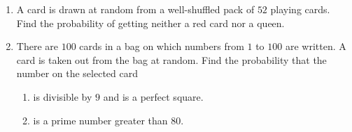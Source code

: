 \begin{enumerate}
    \item A card is drawn at random from a well-shuffled pack of $52$ playing cards. Find the probability of getting neither a red card nor a queen.

\item There are $100$ cards in a bag on which numbers from $1$ to $100$ are written. A card is taken out from the bag at random. Find the probability that the number on the selected card
    \begin{enumerate}
        \item is divisible by $9$ and is a perfect square.
        \item is a prime number greater than $80$.                  \end{enumerate}
								\end{enumerate}
